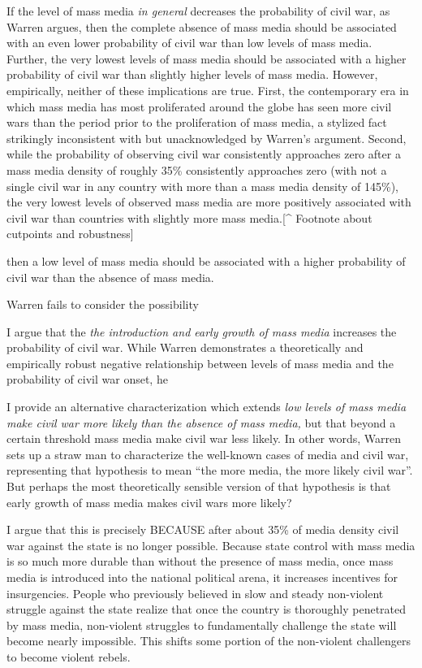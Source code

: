 \documentclass[11pt,article,oneside]{memoir}
\begin{document}
If the level of mass media \emph{in general} decreases the probability
of civil war, as Warren argues, then the complete absence of mass media
should be associated with an even lower probability of civil war than
low levels of mass media. Further, the very lowest levels of mass media
should be associated with a higher probability of civil war than
slightly higher levels of mass media. However, empirically, neither of
these implications are true. First, the contemporary era in which mass
media has most proliferated around the globe has seen more civil wars
than the period prior to the proliferation of mass media, a stylized
fact strikingly inconsistent with but unacknowledged by Warren's
argument. Second, while the probability of observing civil war
consistently approaches zero after a mass media density of roughly 35\%
consistently approaches zero (with not a single civil war in any country
with more than a mass media density of 145\%), the very lowest levels of
observed mass media are more positively associated with civil war than
countries with slightly more mass media.{[}\^{} Footnote about cutpoints
and robustness{]}

then a low level of mass media should be associated with a higher
probability of civil war than the absence of mass media.

Warren fails to consider the possibility

I argue that the \emph{the introduction and early growth of mass media}
increases the probability of civil war. While Warren demonstrates a
theoretically and empirically robust negative relationship between
levels of mass media and the probability of civil war onset, he

I provide an alternative characterization which extends \emph{low levels
of mass media make civil war more likely than the absence of mass
media,} but that beyond a certain threshold mass media make civil war
less likely. In other words, Warren sets up a straw man to characterize
the well-known cases of media and civil war, representing that
hypothesis to mean ``the more media, the more likely civil war''. But
perhaps the most theoretically sensible version of that hypothesis is
that early growth of mass media makes civil wars more likely?

I argue that this is precisely BECAUSE after about 35\% of media density
civil war against the state is no longer possible. Because state control
with mass media is so much more durable than without the presence of
mass media, once mass media is introduced into the national political
arena, it increases incentives for insurgencies. People who previously
believed in slow and steady non-violent struggle against the state
realize that once the country is thoroughly penetrated by mass media,
non-violent struggles to fundamentally challenge the state will become
nearly impossible. This shifts some portion of the non-violent
challengers to become violent rebels.
\end{document}
